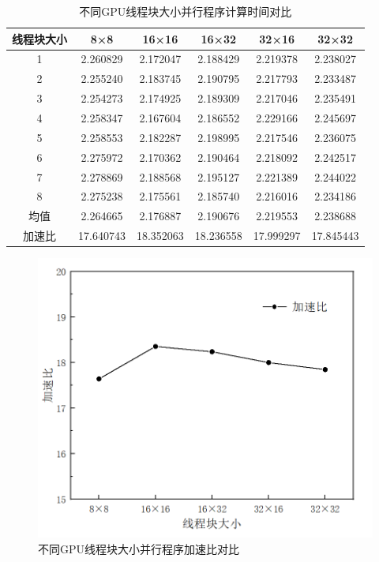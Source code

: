 \documentclass[UTF8]{ctexart}
\begin{document}
        \begin{table}[]
            \centering %
            \caption{\textup{\heiti 不同GPU线程块大小并行程序计算时间对比}}\label{timegpu} %
            \begin{tabular}{|c|c|c|c|c|c|}
            \hline
            线程块大小 & 8×8       & 16×16     & 16×32     & 32×16     & 32×32     \\ \hline
            1     & 2.260829  & 2.172047  & 2.188429  & 2.219378  & 2.238027  \\
            2     & 2.255240  & 2.183745  & 2.190795  & 2.217793  & 2.233487  \\
            3     & 2.254273  & 2.174925  & 2.189309  & 2.217046  & 2.235491  \\
            4     & 2.258347  & 2.167604  & 2.186552  & 2.229166  & 2.245697  \\
            5     & 2.258553  & 2.182287  & 2.198995  & 2.217546  & 2.236075  \\
            6     & 2.275972  & 2.170362  & 2.190464  & 2.218092  & 2.242517  \\
            7     & 2.278869  & 2.188568  & 2.195127  & 2.221389  & 2.244022  \\
            8     & 2.275238  & 2.175561  & 2.185740  & 2.216016  & 2.234186  \\ \hline
            均值    & 2.264665  & 2.176887  & 2.190676  & 2.219553  & 2.238688  \\ \hline
            加速比   & 17.640743 & 18.352063 & 18.236558 & 17.999297 & 17.845443 \\ \hline
            \end{tabular}
        \end{table}

        \begin{figure}[H]
            \centering
            \includegraphics[scale=0.38]{./figures/fig2.png}
            \caption{\textup{\heiti 不同GPU线程块大小并行程序加速比对比} }
            \label{fig:2}
        \end{figure}
        
\end{document}
